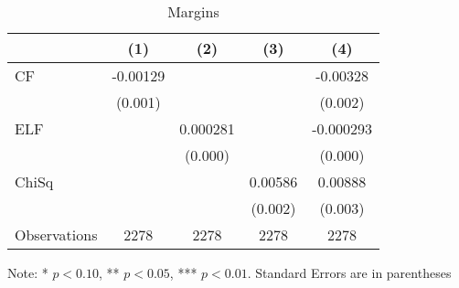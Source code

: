 \begin{table}[htbp]
\caption{Margins \label{bwght}}
\centering \renewcommand*{\arraystretch}{1.2}
\begin{threeparttable}
\begin{tabular}{l*{4}{c}}
\hline
            &\multicolumn{1}{c}{(1)}&\multicolumn{1}{c}{(2)}&\multicolumn{1}{c}{(3)}&\multicolumn{1}{c}{(4)}\\
\hline
CF          &    -0.00129         &                     &                     &    -0.00328\sym{**} \\
            &     (0.001)         &                     &                     &     (0.002)         \\
ELF         &                     &    0.000281         &                     &   -0.000293         \\
            &                     &     (0.000)         &                     &     (0.000)         \\
ChiSq       &                     &                     &     0.00586\sym{***}&     0.00888\sym{***}\\
            &                     &                     &     (0.002)         &     (0.003)         \\
\hline
Observations&        2278         &        2278         &        2278         &        2278         \\
\hline \hline
\end{tabular}
\begin{tablenotes} \footnotesize
\item Note: * \(p<0.10\), ** \(p<0.05\), *** \(p<0.01\). Standard Errors are in parentheses
\end{tablenotes}
\end{threeparttable}
\end{table}
